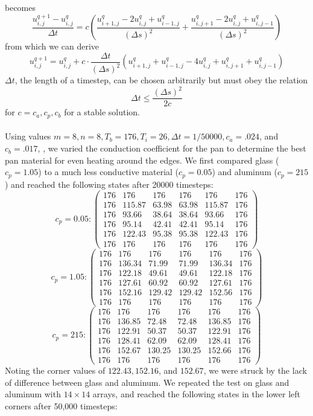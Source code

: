 \documentclass[11pt, fullpage]{article}
\begin{document}
\begin{enumerate}
becomes
\[\dfrac{u_{i,j}^{q+1} - u_{i,j}^q}{\Delta t} = c  \left(\dfrac{u_{i+1,j}^q - 2u_{i,j}^q + u_{i-1,j}^q}{(\Delta s)^2} + \dfrac{u_{i,j+1}^q - 2u_{i,j}^q + u_{i,j-1}^q}{(\Delta s)^2}\right)\]
from which we can derive
\[u_{i,j}^{q+1} = u_{i,j}^q + c \cdot \frac{\Delta t}{(\Delta s)^2} \left(u_{i+1,j}^q + u_{i-1,j}^q - 4u_{i,j}^q + u_{i,j+1}^q + u_{i,j-1}^q \right)\]
$\Delta t$, the length of a timestep, can be chosen arbitrarily but must obey the relation
\[\Delta t \leq \frac{(\Delta s)^2}{2c}\]
for $c = c_a,c_p,c_b$ for a stable solution.\\
\\
Using values $m = 8, n=8, T_b = 176, T_i = 26, \Delta t = 1/50000, c_a = .024$, and $c_b = .017$, , we varied the conduction coefficient for the pan to determine the best pan material for even heating around the edges.  We first compared glass ($c_p = 1.05$) to a much less conductive material ($c_p = 0.05$) and aluminum ($c_p = 215$) and reached the following states after 20000 timesteps:
\[c_p = 0.05: \begin{pmatrix} 176&176&176&176&176&176\\
						176&115.87&63.98&63.98&115.87&176\\
						176&93.66&38.64&38.64&93.66&176\\
						176&95.14&42.41&42.41&95.14&176\\
						176&122.43&95.38&95.38&122.43&176\\
					        176&176&176&176&176&176 \end{pmatrix}\] 
\[c_p = 1.05: \begin{pmatrix} 176&176&176&176&176&176\\
						176&136.34&71.99&71.99&136.34&176\\
						176&122.18&49.61&49.61&122.18&176\\
						176&127.61&60.92&60.92&127.61&176\\
						176&152.16&129.42&129.42&152.56&176\\
					        176&176&176&176&176&176 \end{pmatrix}\]
\[c_p = 215: \begin{pmatrix} 176&176&176&176&176&176\\
						176&136.85&72.48&72.48&136.85&176\\
						176&122.91&50.37&50.37&122.91&176\\
						176&128.41&62.09&62.09&128.41&176\\
						176&152.67&130.25&130.25&152.66&176\\
					        176&176&176&176&176&176 \end{pmatrix}\]
Noting the corner values of $122.43, 152.16$, and $152.67$, we were struck by the lack of difference between glass and aluminum.  We repeated the test on glass and aluminum with $14 \times 14$ arrays, and reached the following states in the lower left corners after 50,000 timesteps:


\end{enumerate}
\end{document}
